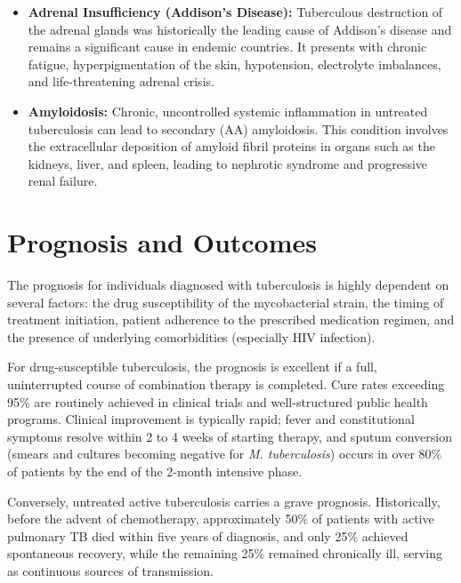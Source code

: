 \begin{itemize}
    \item \textbf{Adrenal Insufficiency (Addison's Disease):} Tuberculous destruction of the adrenal glands was historically the leading cause of Addison's disease and remains a significant cause in endemic countries. It presents with chronic fatigue, hyperpigmentation of the skin, hypotension, electrolyte imbalances, and life-threatening adrenal crisis.
    \item \textbf{Amyloidosis:} Chronic, uncontrolled systemic inflammation in untreated tuberculosis can lead to secondary (AA) amyloidosis. This condition involves the extracellular deposition of amyloid fibril proteins in organs such as the kidneys, liver, and spleen, leading to nephrotic syndrome and progressive renal failure.
\end{itemize}

\section*{Prognosis and Outcomes}
The prognosis for individuals diagnosed with tuberculosis is highly dependent on several factors: the drug susceptibility of the mycobacterial strain, the timing of treatment initiation, patient adherence to the prescribed medication regimen, and the presence of underlying comorbidities (especially HIV infection).

For drug-susceptible tuberculosis, the prognosis is excellent if a full, uninterrupted course of combination therapy is completed. Cure rates exceeding 95\% are routinely achieved in clinical trials and well-structured public health programs. Clinical improvement is typically rapid; fever and constitutional symptoms resolve within 2 to 4 weeks of starting therapy, and sputum conversion (smears and cultures becoming negative for \textit{M. tuberculosis}) occurs in over 80\% of patients by the end of the 2-month intensive phase.

Conversely, untreated active tuberculosis carries a grave prognosis. Historically, before the advent of chemotherapy, approximately 50\% of patients with active pulmonary TB died within five years of diagnosis, and only 25\% achieved spontaneous recovery, while the remaining 25\% remained chronically ill, serving as continuous sources of transmission.

